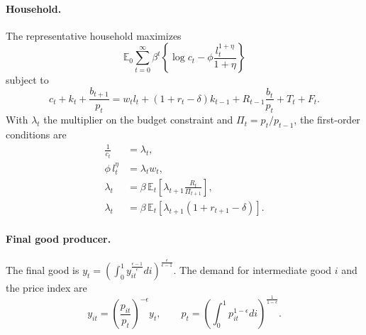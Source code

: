 \documentclass[12pt]{article}
\begin{document}
\paragraph{Household.} The representative household maximizes
\begin{equation*}
\mathbb{E}_0 \sum_{t=0}^{\infty} \beta^t \left\{ \log c_t - \phi \frac{l_t^{1+\eta}}{1+\eta} \right\}
\end{equation*}
subject to
\begin{equation*}
c_t + k_t + \frac{b_{t+1}}{p_t} = w_t l_t + (1 + r_t - \delta) k_{t-1} + R_{t-1} \frac{b_t}{p_t} + T_t + F_t .
\end{equation*}
With $\lambda_t$ the multiplier on the budget constraint and $\Pi_t = p_t/p_{t-1}$, the first-order conditions are
\begin{align}
\frac{1}{c_t} &= \lambda_t, \label{eq:hh-foc-c} \\
\phi\, l_t^{\eta} &= \lambda_t w_t, \\
\lambda_t &= \beta\, \mathbb{E}_t \left[ \lambda_{t+1} \frac{R_t}{\Pi_{t+1}} \right], \\
\lambda_t &= \beta\, \mathbb{E}_t \left[ \lambda_{t+1} (1 + r_{t+1} - \delta) \right]. \label{eq:hh-foc-capital}
\end{align}

\paragraph{Final good producer.} The final good is $y_t = \left( \int_0^1 y_{it}^{\frac{\epsilon-1}{\epsilon}} di \right)^{\frac{\epsilon}{\epsilon-1}}$. The demand for intermediate good $i$ and the price index are
\begin{equation}
y_{it} = \left( \frac{p_{it}}{p_t} \right)^{-\epsilon} y_t, \qquad
p_t = \left( \int_0^1 p_{it}^{1-\epsilon} di \right)^{\frac{1}{1-\epsilon}} . \label{eq:final-good}
\end{equation}
\end{document}
